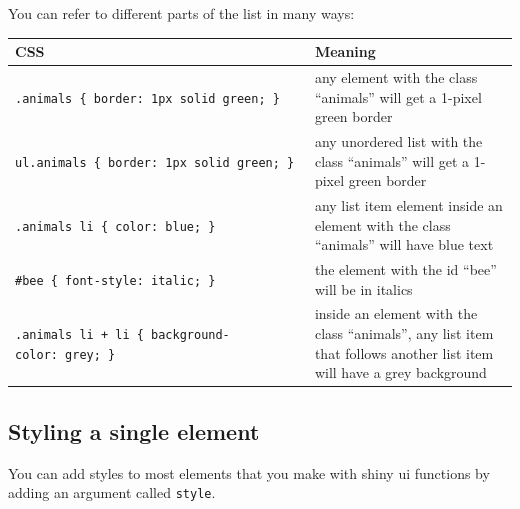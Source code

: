\documentclass[
]{book}
\newenvironment{Shaded}{\begin{snugshade}}{\end{snugshade}}
\newcommand{\AttributeTok}[1]{\textcolor[rgb]{0.77,0.63,0.00}{#1}}
\newcommand{\FunctionTok}[1]{\textcolor[rgb]{0.00,0.00,0.00}{#1}}
\newcommand{\NormalTok}[1]{#1}
\newcommand{\SpecialCharTok}[1]{\textcolor[rgb]{0.00,0.00,0.00}{#1}}
\newcommand{\StringTok}[1]{\textcolor[rgb]{0.31,0.60,0.02}{#1}}
\begin{document}
You can refer to different parts of the list in many ways:

\begin{longtable}[]{@{}
  >{\raggedright\arraybackslash}p{}
  >{\raggedright\arraybackslash}p{}@{}}
\toprule
CSS & Meaning \\
\midrule
\endhead
\texttt{.animals\ \{\ border:\ 1px\ solid\ green;\ \}} & any element with the class ``animals'' will get a 1-pixel green border \\
\texttt{ul.animals\ \{\ border:\ 1px\ solid\ green;\ \}} & any unordered list with the class ``animals'' will get a 1-pixel green border \\
\texttt{.animals\ li\ \{\ color:\ blue;\ \}} & any list item element inside an element with the class ``animals'' will have blue text \\
\texttt{\#bee\ \{\ font-style:\ italic;\ \}} & the element with the id ``bee'' will be in italics \\
\texttt{.animals\ li\ +\ li\ \{\ background-color:\ grey;\ \}} & inside an element with the class ``animals'', any list item that follows another list item will have a grey background \\
\bottomrule
\end{longtable}

\hypertarget{styling-a-single-element}{%
\subsection{Styling a single element}\label{styling-a-single-element}}

You can add styles to most elements that you make with shiny ui functions by adding an argument called \texttt{style}.

\begin{Shaded}
\end{Shaded}
\end{document}
